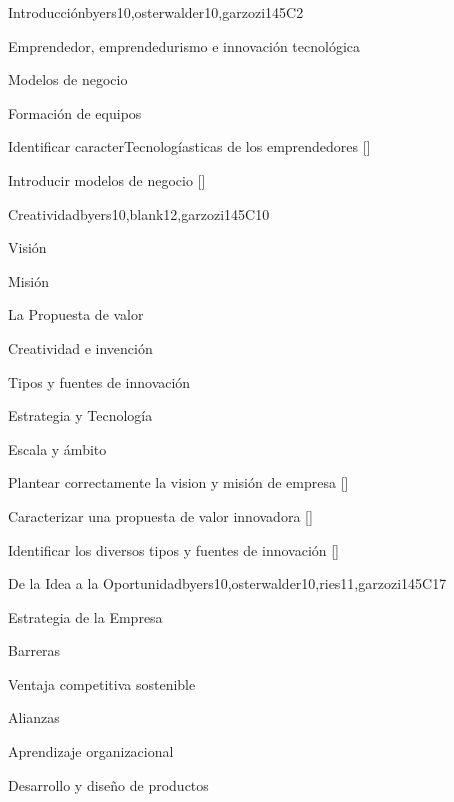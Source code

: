 \begin{syllabus}
\begin{unit}{}{Introducción}{byers10,osterwalder10,garzozi14}{5}{C2}
\begin{topics}
    \item Emprendedor, emprendedurismo e innovación tecnológica
    \item Modelos de negocio
    \item Formación de equipos
\end{topics}

\begin{learningoutcomes} 
    \item Identificar caracterTecnologíasticas de los emprendedores  [\Familiarity]
    \item Introducir modelos de negocio  [\Familiarity]
\end{learningoutcomes} 
\end{unit}
   
\begin{unit}{}{Creatividad}{byers10,blank12,garzozi14}{5}{C10}
    \begin{topics}
        \item Visión
        \item Misión
        \item La Propuesta de valor
        \item Creatividad e invención
        \item Tipos y fuentes de innovación
        \item Estrategia y Tecnología
        \item Escala y ámbito
    \end{topics}

    \begin{learningoutcomes} 
        \item Plantear correctamente la vision y misión de empresa  [\Usage]
        \item Caracterizar una propuesta de valor innovadora  [\Assessment]
        \item Identificar los diversos tipos y fuentes de innovación  [\Familiarity]
    \end{learningoutcomes} 
\end{unit}
   
\begin{unit}{}{De la Idea a la Oportunidad}{byers10,osterwalder10,ries11,garzozi14}{5}{C17}
\begin{topics}
    \item Estrategia de la Empresa
    \item Barreras 
    \item Ventaja competitiva sostenible
    \item Alianzas
    \item Aprendizaje organizacional
    \item Desarrollo y diseño de productos
\end{topics}


\end{unit}
\end{syllabus}
